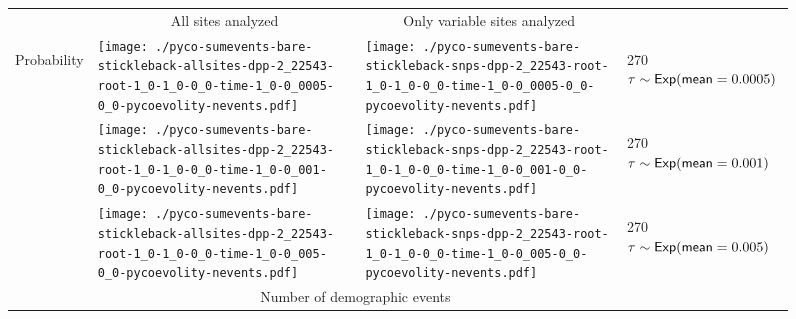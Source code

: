 \documentclass[border=10pt,varwidth=30cm]{standalone}
\begin{document}
\begin{figure}
    \centering
    \begin{tabular}{@{}llll@{}}
        & \multicolumn{1}{c}{\large All sites analyzed} & \multicolumn{1}{c}{\large Only variable sites analyzed} & \\[1ex]
        \multirow{2}{*}[-4em]{\begin{sideways}\large Probability\end{sideways}}
        & \texttt{[image: ./pyco-sumevents-bare-stickleback-allsites-dpp-2\_22543-root-1\_0-1\_0-0\_0-time-1\_0-0\_0005-0\_0-pycoevolity-nevents.pdf]}
        & \texttt{[image: ./pyco-sumevents-bare-stickleback-snps-dpp-2\_22543-root-1\_0-1\_0-0\_0-time-1\_0-0\_0005-0\_0-pycoevolity-nevents.pdf]}
        & \multirow{1}{*}[11.5em]{\begin{rotate}{270}$\tau \sim \textrm{\sffamily Exp}(\textrm{\sffamily mean}=0.0005)$\end{rotate}} \\
        & \texttt{[image: ./pyco-sumevents-bare-stickleback-allsites-dpp-2\_22543-root-1\_0-1\_0-0\_0-time-1\_0-0\_001-0\_0-pycoevolity-nevents.pdf]}
        & \texttt{[image: ./pyco-sumevents-bare-stickleback-snps-dpp-2\_22543-root-1\_0-1\_0-0\_0-time-1\_0-0\_001-0\_0-pycoevolity-nevents.pdf]}
        & \multirow{1}{*}[11em]{\begin{rotate}{270}$\tau \sim \textrm{\sffamily Exp}(\textrm{\sffamily mean}=0.001)$\end{rotate}} \\
        & \texttt{[image: ./pyco-sumevents-bare-stickleback-allsites-dpp-2\_22543-root-1\_0-1\_0-0\_0-time-1\_0-0\_005-0\_0-pycoevolity-nevents.pdf]}
        & \texttt{[image: ./pyco-sumevents-bare-stickleback-snps-dpp-2\_22543-root-1\_0-1\_0-0\_0-time-1\_0-0\_005-0\_0-pycoevolity-nevents.pdf]}
        & \multirow{1}{*}[11em]{\begin{rotate}{270}$\tau \sim \textrm{\sffamily Exp}(\textrm{\sffamily mean}=0.005)$\end{rotate}} \\
        & \multicolumn{2}{c}{\large Number of demographic events} & 
    \end{tabular}
\end{figure}
\end{document}
